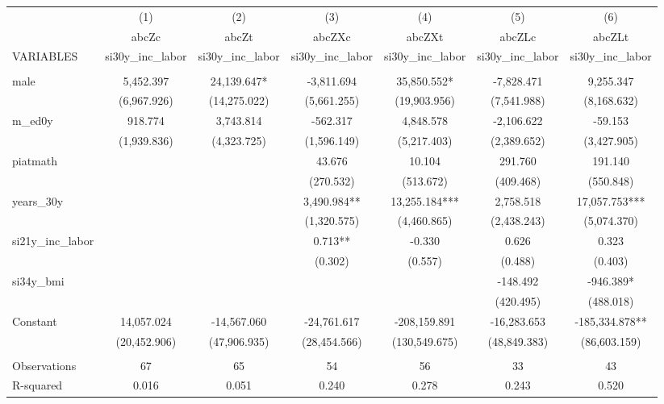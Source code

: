 \begin{tabular}{lcccccc} \hline
 & (1) & (2) & (3) & (4) & (5) & (6) \\
 & abcZc & abcZt & abcZXc & abcZXt & abcZLc & abcZLt \\
VARIABLES & si30y\_inc\_labor & si30y\_inc\_labor & si30y\_inc\_labor & si30y\_inc\_labor & si30y\_inc\_labor & si30y\_inc\_labor \\ \hline
 &  &  &  &  &  &  \\
male & 5,452.397 & 24,139.647* & -3,811.694 & 35,850.552* & -7,828.471 & 9,255.347 \\
 & (6,967.926) & (14,275.022) & (5,661.255) & (19,903.956) & (7,541.988) & (8,168.632) \\
m\_ed0y & 918.774 & 3,743.814 & -562.317 & 4,848.578 & -2,106.622 & -59.153 \\
 & (1,939.836) & (4,323.725) & (1,596.149) & (5,217.403) & (2,389.652) & (3,427.905) \\
piatmath &  &  & 43.676 & 10.104 & 291.760 & 191.140 \\
 &  &  & (270.532) & (513.672) & (409.468) & (550.848) \\
years\_30y &  &  & 3,490.984** & 13,255.184*** & 2,758.518 & 17,057.753*** \\
 &  &  & (1,320.575) & (4,460.865) & (2,438.243) & (5,074.370) \\
si21y\_inc\_labor &  &  & 0.713** & -0.330 & 0.626 & 0.323 \\
 &  &  & (0.302) & (0.557) & (0.488) & (0.403) \\
si34y\_bmi &  &  &  &  & -148.492 & -946.389* \\
 &  &  &  &  & (420.495) & (488.018) \\
Constant & 14,057.024 & -14,567.060 & -24,761.617 & -208,159.891 & -16,283.653 & -185,334.878** \\
 & (20,452.906) & (47,906.935) & (28,454.566) & (130,549.675) & (48,849.383) & (86,603.159) \\
 &  &  &  &  &  &  \\
Observations & 67 & 65 & 54 & 56 & 33 & 43 \\
 R-squared & 0.016 & 0.051 & 0.240 & 0.278 & 0.243 & 0.520 \\ \hline
\end{tabular}
